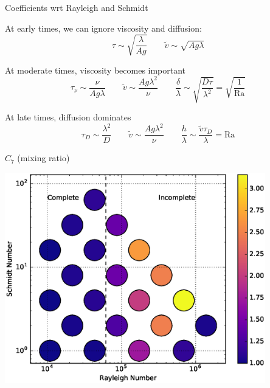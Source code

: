 \documentclass[12pt]{beamer}
\begin{document}
\begin{frame}[t]{Coefficients wrt Rayleigh and Schmidt}

At early times, we can ignore viscosity and diffusion:
\begin{equation*}
\tau \sim \sqrt{\frac{\lambda}{A g}} \qquad \tilde{v} \sim \sqrt{A g \lambda}
\end{equation*}

At moderate times, viscosity becomes important
\begin{equation*}
\tau_\nu \sim \frac{\nu}{A g \lambda} \qquad \tilde{v} \sim \frac{A g \lambda^2}{\nu} \qquad \frac{\delta}{\lambda} \sim \sqrt{\frac{D \tau}{\lambda^2}} = \sqrt{\frac{1}{\text{Ra}}}
\end{equation*}

At late times, diffusion dominates
\begin{equation*}
\tau_D \sim \frac{\lambda^2}{D} \qquad \tilde{v} \sim \frac{A g \lambda^2}{\nu} \qquad \frac{h}{\lambda} \sim \frac{\tilde{v} \tau_D}{\lambda} = \text{Ra}
\end{equation*}
\end{frame}

\begin{frame}[t]{$C_7$ (mixing ratio)}
\begin{center}
\vspace{-11pt}
\includegraphics[width=0.85\textwidth]{graphics/C7-vs-Rayleigh-Schmidt.eps}
\end{center}
\end{frame}
\end{document}
